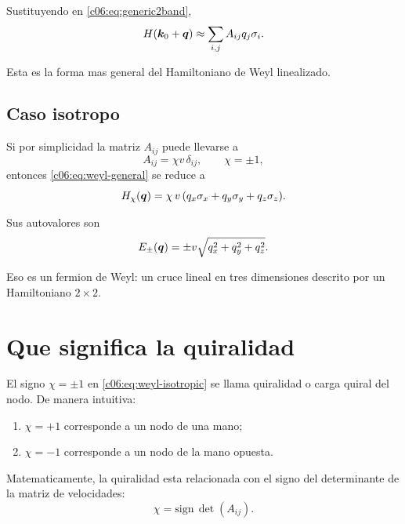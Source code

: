 Sustituyendo en \eqref{c06:eq:generic2band},
\begin{equation}
H(\bm{k}_0+\bm{q})\approx \sum_{i,j} A_{ij}q_j \sigma_i.
\label{c06:eq:weyl-general}
\end{equation}

Esta es la forma mas general del Hamiltoniano de Weyl linealizado.

\subsection{Caso isotropo}

Si por simplicidad la matriz \(A_{ij}\) puede llevarse a
\begin{equation}
A_{ij}=\chi v\,\delta_{ij},
\qquad \chi=\pm 1,
\end{equation}
entonces \eqref{c06:eq:weyl-general} se reduce a
\begin{equation}
H_\chi(\bm{q})=\chi\, v \,(q_x\sigma_x + q_y\sigma_y + q_z\sigma_z).
\label{c06:eq:weyl-isotropic}
\end{equation}

Sus autovalores son
\begin{equation}
E_\pm(\bm{q})=\pm v\sqrt{q_x^2+q_y^2+q_z^2}.
\label{c06:eq:weyl-dispersion}
\end{equation}

Eso es un fermion de Weyl: un cruce lineal en tres dimensiones descrito por un Hamiltoniano \(2\times 2\).

\section{Que significa la quiralidad}

El signo \(\chi=\pm 1\) en \eqref{c06:eq:weyl-isotropic} se llama quiralidad o carga quiral del nodo. De manera intuitiva:

\begin{enumerate}[leftmargin=*]
  \item \(\chi=+1\) corresponde a un nodo de una mano;
  \item \(\chi=-1\) corresponde a un nodo de la mano opuesta.
\end{enumerate}

Matematicamente, la quiralidad esta relacionada con el signo del determinante de la matriz de velocidades:
\begin{equation}
\chi = \mathrm{sign}\,\det(A_{ij}).
\label{c06:eq:chirality-det}
\end{equation}

